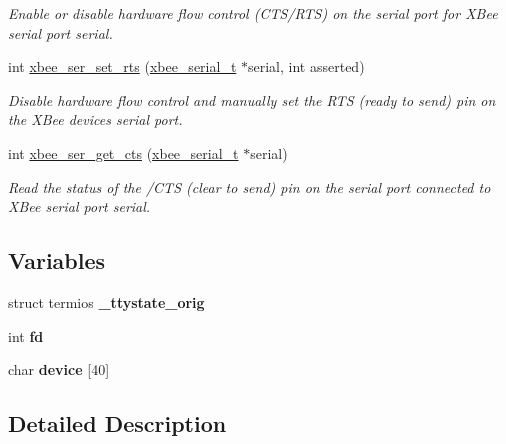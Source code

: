 \begin{DoxyCompactItemize}
\begin{DoxyCompactList}\small\item\em Enable or disable hardware flow control (C\+T\+S/\+R\+TS) on the serial port for X\+Bee serial port {\itshape serial}. \end{DoxyCompactList}\item 
int \hyperlink{group__hal__posix_ga731188d8cf41d3d749bc84d51b672535}{xbee\+\_\+ser\+\_\+set\+\_\+rts} (\hyperlink{structxbee__serial__t}{xbee\+\_\+serial\+\_\+t} $\ast$serial, int asserted)
\begin{DoxyCompactList}\small\item\em Disable hardware flow control and manually set the R\+TS (ready to send) pin on the X\+Bee device\textquotesingle{}s serial port. \end{DoxyCompactList}\item 
int \hyperlink{group__hal__posix_ga894f6fadc890b5ba5ce32338f0acd217}{xbee\+\_\+ser\+\_\+get\+\_\+cts} (\hyperlink{structxbee__serial__t}{xbee\+\_\+serial\+\_\+t} $\ast$serial)
\begin{DoxyCompactList}\small\item\em Read the status of the /\+C\+TS (clear to send) pin on the serial port connected to X\+Bee serial port {\itshape serial}. \end{DoxyCompactList}\end{DoxyCompactItemize}
\subsection*{Variables}
\begin{DoxyCompactItemize}
\item 
\mbox{\label{group__hal__posix_ga76ecd97a6b292c01fccef4f06a562f2d}} 
struct termios {\bfseries \+\_\+ttystate\+\_\+orig}
\item 
\mbox{\label{group__hal__posix_ga6f8059414f0228f0256115e024eeed4b}} 
int {\bfseries fd}
\item 
\mbox{\label{group__hal__posix_ga3a03f8d1b13de77b5c0885971a535d02}} 
char {\bfseries device} \mbox{[}40\mbox{]}
\end{DoxyCompactItemize}


\subsection{Detailed Description}


